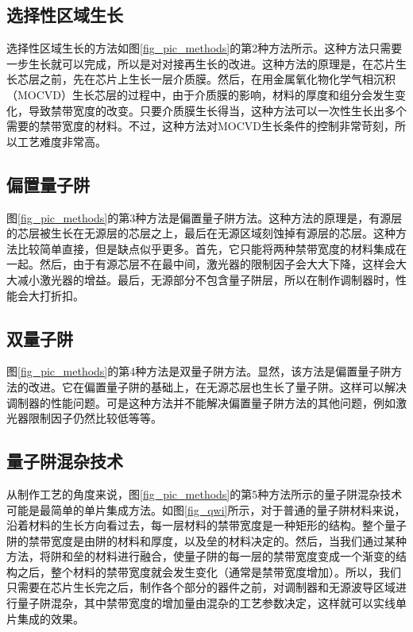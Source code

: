 \documentclass{ZJUthesis}
\begin{document}
\subsection{选择性区域生长}

选择性区域生长的方法如图\ref{fig_pic_methods}的第2种方法所示。这种方法只需要一步生长就可以完成，所以是对对接再生长的改进。这种方法的原理是，在芯片生长芯层之前，先在芯片上生长一层介质膜。然后，在用金属氧化物化学气相沉积（MOCVD）生长芯层的过程中，由于介质膜的影响，材料的厚度和组分会发生变化，导致禁带宽度的改变。只要介质膜生长得当，这种方法可以一次性生长出多个需要的禁带宽度的材料。不过，这种方法对MOCVD生长条件的控制非常苛刻，所以工艺难度非常高。

\subsection{偏置量子阱}

图\ref{fig_pic_methods}的第3种方法是偏置量子阱方法。这种方法的原理是，有源层的芯层被生长在无源层的芯层之上，最后在无源区域刻蚀掉有源层的芯层。这种方法比较简单直接，但是缺点似乎更多。首先，它只能将两种禁带宽度的材料集成在一起。然后，由于有源芯层不在最中间，激光器的限制因子会大大下降，这样会大大减小激光器的增益。最后，无源部分不包含量子阱层，所以在制作调制器时，性能会大打折扣。

\subsection{双量子阱}

图\ref{fig_pic_methods}的第4种方法是双量子阱方法。显然，该方法是偏置量子阱方法的改进。它在偏置量子阱的基础上，在无源芯层也生长了量子阱。这样可以解决调制器的性能问题。可是这种方法并不能解决偏置量子阱方法的其他问题，例如激光器限制因子仍然比较低等等。

\subsection{量子阱混杂技术}

从制作工艺的角度来说，图\ref{fig_pic_methods}的第5种方法所示的量子阱混杂技术可能是最简单的单片集成方法。如图\ref{fig_qwi}所示，对于普通的量子阱材料来说，沿着材料的生长方向看过去，每一层材料的禁带宽度是一种矩形的结构。整个量子阱的禁带宽度是由阱的材料和厚度，以及垒的材料决定的。然后，当我们通过某种方法，将阱和垒的材料进行融合，使量子阱的每一层的禁带宽度变成一个渐变的结构之后，整个材料的禁带宽度就会发生变化（通常是禁带宽度增加）。所以，我们只需要在芯片生长完之后，制作各个部分的器件之前，对调制器和无源波导区域进行量子阱混杂，其中禁带宽度的增加量由混杂的工艺参数决定，这样就可以实线单片集成的效果。
\end{document}
